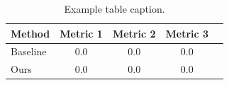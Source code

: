 \begin{table}[t]
  \caption{Example table caption.}
  \label{tab:example}
  \begin{center}
    \begin{small}
      \begin{sc}
        \begin{tabular}{lcccr}
          \toprule
          Method & Metric 1 & Metric 2 & Metric 3 \\
          \midrule
          Baseline & 0.0 & 0.0 & 0.0 \\
          Ours & 0.0 & 0.0 & 0.0 \\
          \bottomrule
        \end{tabular}
      \end{sc}
    \end{small}
  \end{center}
  \vskip -0.1in
\end{table}
